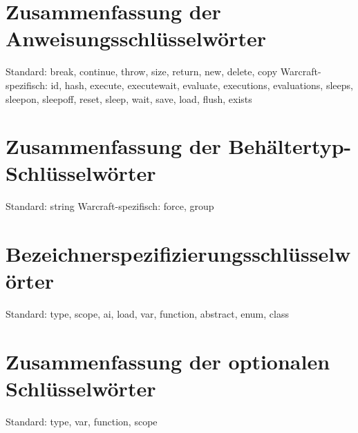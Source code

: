 \section{Zusammenfassung der Anweisungsschlüsselwörter}
Standard: break, continue, throw, size, return, new, delete, copy
Warcraft-spezifisch: id, hash, execute, executewait, evaluate, executions, evaluations, sleeps, sleepon, sleepoff, reset, sleep, wait, save, load, flush, exists

\section{Zusammenfassung der Behältertyp-Schlüsselwörter}
Standard: string
Warcraft-spezifisch: force, group

\section{Bezeichnerspezifizierungsschlüsselwörter}
Standard: type, scope, ai, load, var, function, abstract, enum, class

\section{Zusammenfassung der optionalen Schlüsselwörter}
Standard: type, var, function, scope 

